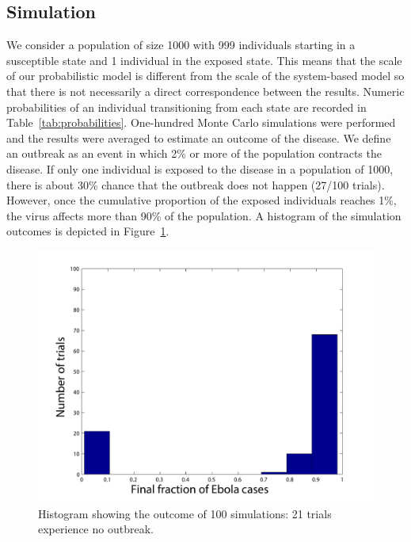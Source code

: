 \subsection{Simulation}
We consider a population of size 1000 with 999 individuals starting in a susceptible state and 1 individual in the exposed state. This means that the scale of our probabilistic model is different from the scale of the system-based model so that there is not necessarily a direct correspondence between the results. Numeric probabilities of an individual transitioning from each state are recorded in Table~\ref{tab:probabilities}. One-hundred Monte Carlo simulations were performed and the results were averaged to estimate an outcome of the disease. We define an outbreak as an event in which 2\% or more of the population contracts the disease. If only one individual is exposed to the disease in a population of 1000, there is about 30\% chance that the outbreak does not happen (27/100 trials). However, once the cumulative proportion of the exposed individuals reaches 1\%, the virus affects more than 90\% of the population. A histogram of the simulation outcomes is depicted in Figure~\ref{fig:Hist}.
%
%
%
%
%
%
\begin{figure}[h!]
\begin{center}
\includegraphics[scale=0.5]{N100Hist}
\end{center}
\caption{Histogram showing the outcome of 100 simulations: 21 trials experience no outbreak.}
\label{fig:Hist}
\end{figure}


